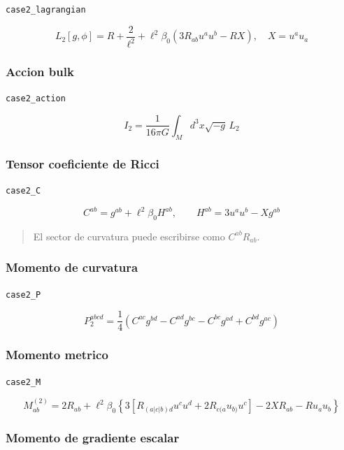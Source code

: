 \documentclass[11pt,a4paper]{article}
\begin{document}
\noindent\texttt{case2\_lagrangian}\par\nopagebreak[4]

\[
L_2[g,\phi] = R+\frac{2}{\ell^2}+\ell^2\beta_0\left(3R_{ab}u^au^b-RX\right),\quad X=u^au_a
\]

\subsubsection{Accion bulk}

\noindent\texttt{case2\_action}\par\nopagebreak[4]

\[
I_2 = \frac{1}{16\pi G}\int_Md^3x\sqrt{-g}\,L_2
\]

\subsubsection{Tensor coeficiente de Ricci}

\noindent\texttt{case2\_C}\par\nopagebreak[4]

\[
C^{ab} = g^{ab}+\ell^2\beta_0H^{ab},\qquad H^{ab}=3u^au^b-Xg^{ab}
\]

\begin{quote}\small El sector de curvatura puede escribirse como \(C^{ab}R_{ab}\).\end{quote}

\subsubsection{Momento de curvatura}

\noindent\texttt{case2\_P}\par\nopagebreak[4]

\[
P_2^{abcd} = \frac14\left(C^{ac}g^{bd}-C^{ad}g^{bc}-C^{bc}g^{ad}+C^{bd}g^{ac}\right)
\]

\subsubsection{Momento metrico}

\noindent\texttt{case2\_M}\par\nopagebreak[4]

\[
M^{(2)}_{ab} = 2R_{ab}+\ell^2\beta_0\left\{3\left[R_{(a|c|b)d}u^cu^d+2R_{c(a}u_{b)}u^c\right]-2XR_{ab}-Ru_au_b\right\}
\]

\subsubsection{Momento de gradiente escalar}
\end{document}
